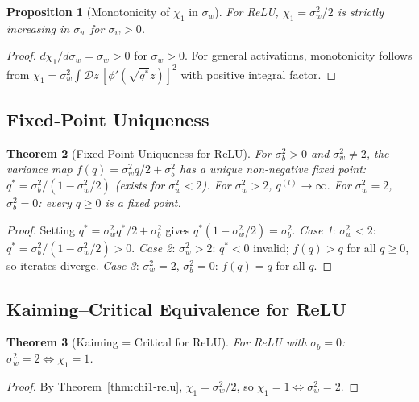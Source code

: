 \documentclass[10pt]{article}
\newtheorem{theorem}{Theorem}
\newtheorem{proposition}[theorem]{Proposition}
\begin{document}
\begin{proposition}[Monotonicity of $\chi_1$ in $\sigma_w$]
\label{prop:monotonicity}
For ReLU, $\chi_1 = \sigma_w^2/2$ is strictly increasing in $\sigma_w$ for $\sigma_w > 0$.
\end{proposition}

\begin{proof}
$d\chi_1/d\sigma_w = \sigma_w > 0$ for $\sigma_w > 0$.
For general activations, monotonicity follows from $\chi_1 = \sigma_w^2 \int \mathcal{D}z\,[\phi'(\sqrt{q^*}z)]^2$ with positive integral factor.
\end{proof}

\subsection{Fixed-Point Uniqueness}

\begin{theorem}[Fixed-Point Uniqueness for ReLU]
\label{thm:fixed-point}
For $\sigma_b^2 > 0$ and $\sigma_w^2 \neq 2$, the variance map $f(q) = \sigma_w^2 q/2 + \sigma_b^2$ has a unique non-negative fixed point: $q^* = \sigma_b^2/(1 - \sigma_w^2/2)$ (exists for $\sigma_w^2 < 2$).
For $\sigma_w^2 > 2$, $q^{(l)} \to \infty$. For $\sigma_w^2 = 2$, $\sigma_b^2 = 0$: every $q \geq 0$ is a fixed point.
\end{theorem}

\begin{proof}
Setting $q^* = \sigma_w^2 q^*/2 + \sigma_b^2$ gives $q^*(1 - \sigma_w^2/2) = \sigma_b^2$.
\emph{Case 1}: $\sigma_w^2 < 2$: $q^* = \sigma_b^2/(1 - \sigma_w^2/2) > 0$.
\emph{Case 2}: $\sigma_w^2 > 2$: $q^* < 0$ invalid; $f(q) > q$ for all $q \geq 0$, so iterates diverge.
\emph{Case 3}: $\sigma_w^2 = 2$, $\sigma_b^2 = 0$: $f(q) = q$ for all $q$.
\end{proof}

\subsection{Kaiming--Critical Equivalence for ReLU}

\begin{theorem}[Kaiming = Critical for ReLU]
\label{thm:kaiming-critical}
For ReLU with $\sigma_b = 0$: $\sigma_w^2 = 2 \Leftrightarrow \chi_1 = 1$.
\end{theorem}

\begin{proof}
By Theorem~\ref{thm:chi1-relu}, $\chi_1 = \sigma_w^2/2$, so $\chi_1 = 1 \Leftrightarrow \sigma_w^2 = 2$.
\end{proof}
\end{document}
